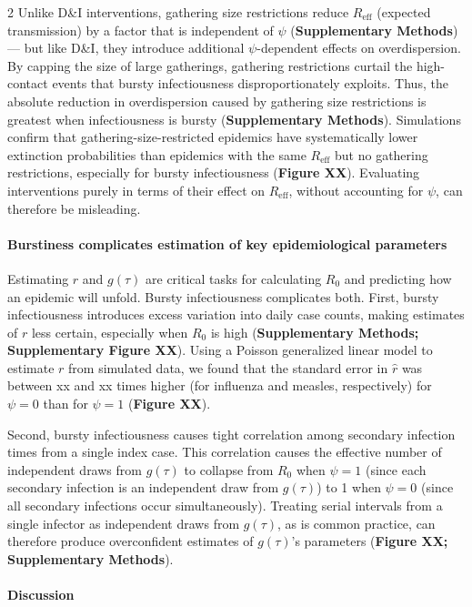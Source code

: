\documentclass[10pt]{article}
\begin{document}
\begin{multicols}{2}
Unlike D\&I interventions, gathering size restrictions reduce $R_\text{eff}$ (expected transmission) by a factor that is independent of $\psi$ ({\bf Supplementary Methods}) --- but like D\&I, they introduce additional $\psi$-dependent effects on overdispersion. By capping the size of large gatherings, gathering restrictions curtail the high-contact events that bursty infectiousness disproportionately exploits. Thus, the absolute reduction in overdispersion caused by gathering size restrictions is greatest when infectiousness is bursty  ({\bf Supplementary Methods}). Simulations confirm that gathering-size-restricted epidemics have systematically lower extinction probabilities than epidemics with the same $R_\text{eff}$ but no gathering restrictions, especially for bursty infectiousness ({\bf Figure XX}). Evaluating interventions purely in terms of their effect on $R_\text{eff}$, without accounting for $\psi$, can therefore be misleading. 

\paragraph{Burstiness complicates estimation of key epidemiological parameters}

Estimating $r$ and $g(\tau)$ are critical tasks for calculating $R_0$ and predicting how an epidemic will unfold. Bursty infectiousness complicates both. First, bursty infectiousness introduces excess variation into daily case counts, making estimates of $r$ less certain, especially when $R_0$ is high ({\bf Supplementary Methods; Supplementary Figure XX}). Using a Poisson generalized linear model to estimate $r$ from simulated data, we found that the standard error in $\hat{r}$ was between xx and xx times higher (for influenza and measles, respectively) for $\psi = 0$ than for $\psi = 1$ ({\bf Figure XX}). 

Second, bursty infectiousness causes tight correlation among secondary infection times from a single index case. This correlation causes the effective number of independent draws from $g(\tau)$ to collapse from $R_0$ when $\psi = 1$ (since each secondary infection is an independent draw from $g(\tau)$) to 1 when $\psi = 0$ (since all secondary infections occur simultaneously). Treating serial intervals from a single infector as independent draws from $g(\tau)$, as is common practice, can therefore produce overconfident estimates of $g(\tau)$'s parameters ({\bf Figure XX; Supplementary Methods}). 

\paragraph{Discussion}


\end{multicols}
\end{document}
